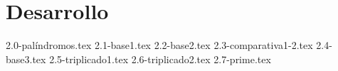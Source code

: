 \part{Desarrollo}

\setcounter{section}{-1}

{2.0-palíndromos.tex}
\newpage
{2.1-base1.tex}
\newpage
{2.2-base2.tex}
\newpage
{2.3-comparativa1-2.tex}
\newpage
{2.4-base3.tex}
\newpage
{2.5-triplicado1.tex}
\newpage
{2.6-triplicado2.tex}
\newpage
{2.7-prime.tex}

\newpage